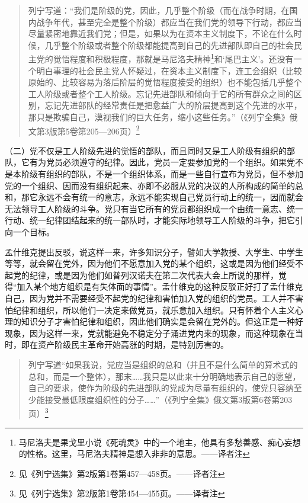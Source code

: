 \begin{quotation}
列宁写道：“我们是阶级的党，因此，几乎整个阶级（而在战争时期，在国内战争年代，甚至完全是整个阶级）都应当在我们党的领导下行动，都应当尽量紧密地靠近我们党；但是，如果以为在资本主义制度下，不论在什么时候，几乎整个阶级或者整个阶级都能提高到自己的先进部队即自己的社会民主党的觉悟程度和积极程度，那就是马尼洛夫精神\footnote{马尼洛夫是果戈里小说《死魂灵》中的一个地主，他具有多愁善感、痴心妄想的性格。这里，马尼洛夫精神是想入非非的意思。——译者注}和‘尾巴主义’。还没有一个明白事理的社会民主党人怀疑过，在资本主义制度下，连工会组织（比较原始的、比较容易为落后阶层的觉悟程度接受的组织）也不能包括几乎整个工人阶级或者整个工人阶级。忘记先进部队和倾向于它的所有群众之间的区别，忘记先进部队的经常责任是把愈益广大的阶层提高到这个先进的水平，那只是欺骗自己，漠视我们的巨大任务，缩小这些任务。”（《列宁全集》俄文第3版第5卷第205—206页）\footnote{见《列宁选集》第2版第1卷第457—458页。——译者注}
\end{quotation}

（二）党不仅是工人阶级先进的觉悟的部队，而且同时又是工人阶级有组织的部队，它有为党员必须遵守的纪律。因此，党员一定要参加党的一个组织。如果党不是本阶级有组织的部队，不是一个组织体系，而是一些自行宣布为党员，但不参加党的一个组织、因而没有组织起来、亦即不必服从党的决议的人所构成的简单的总和，那它永远不会有统一的意志，永远不能实现自己党员行动上的统一，因而就会无法领导工人阶级的斗争。党只有当它所有的党员都组织成一个由统一意志、统一行动、统一纪律团结起来的统一部队时，才能实际地领导工人阶级的斗争，把它引向一个目标。

孟什维克提出反驳，说这样一来，许多知识分子，譬如大学教授、大学生、中学生等等，就会留在党外，因为他们不愿意加入党的某个组织，这或是因为他们经受不起党的纪律，或是因为他们如普列汉诺夫在第二次代表大会上所说的那样，觉得“加入某个地方组织是有失体面的事情”。孟什维克的这种反驳正好打了孟什维克自己，因为党并不需要经受不起党的纪律和害怕加入党的组织的党员。工人并不害怕纪律和组织，所以他们一决定来做党员，就乐意加入组织。只有怀着个人主义心理的知识分子才害怕纪律和组织，因此他们确实是会留在党外的。但这正是一种好现象，因为这样一来，党就能避免不稳定分子涌进党内来的现象，而这种现象在当时，即在资产阶级民主革命开始高涨的时期，是特别厉害的。

\begin{quotation}
列宁写道“如果我说，党应当是组织的总和（并且不是什么简单的算术式的总和，而是一个整体），那末……我只是以此来十分明确地表示自己的愿望，自己的要求，使作为阶级的先进部队的党成为尽量有组织的，使党只容纳至少能接受最低限度组织性的分子……”（《列宁全集》俄文第3版第6卷第203页）\footnote{见《列宁选集》第2版第1卷第454—455页。——译者注}
\end{quotation}

